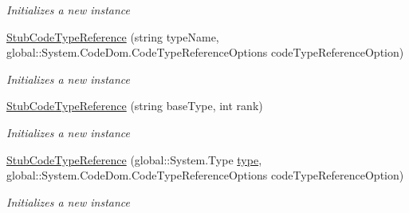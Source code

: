 \begin{DoxyCompactItemize}
\begin{DoxyCompactList}\small\item\em Initializes a new instance\end{DoxyCompactList}\item 
\hyperlink{class_system_1_1_code_dom_1_1_fakes_1_1_stub_code_type_reference_aa7a6c3a0fc046f66a44e2bf503c1bac4}{Stub\-Code\-Type\-Reference} (string type\-Name, global\-::\-System.\-Code\-Dom.\-Code\-Type\-Reference\-Options code\-Type\-Reference\-Option)
\begin{DoxyCompactList}\small\item\em Initializes a new instance\end{DoxyCompactList}\item 
\hyperlink{class_system_1_1_code_dom_1_1_fakes_1_1_stub_code_type_reference_a8c8cf64aa32c4be5c7c539be2a8cc3ef}{Stub\-Code\-Type\-Reference} (string base\-Type, int rank)
\begin{DoxyCompactList}\small\item\em Initializes a new instance\end{DoxyCompactList}\item 
\hyperlink{class_system_1_1_code_dom_1_1_fakes_1_1_stub_code_type_reference_ac516839d52220df978ba07545c3a0ca2}{Stub\-Code\-Type\-Reference} (global\-::\-System.\-Type \hyperlink{jquery-1_810_82-vsdoc_8js_a3940565e83a9bfd10d95ffd27536da91}{type}, global\-::\-System.\-Code\-Dom.\-Code\-Type\-Reference\-Options code\-Type\-Reference\-Option)
\begin{DoxyCompactList}\small\item\em Initializes a new instance\end{DoxyCompactList}\end{DoxyCompactItemize}
